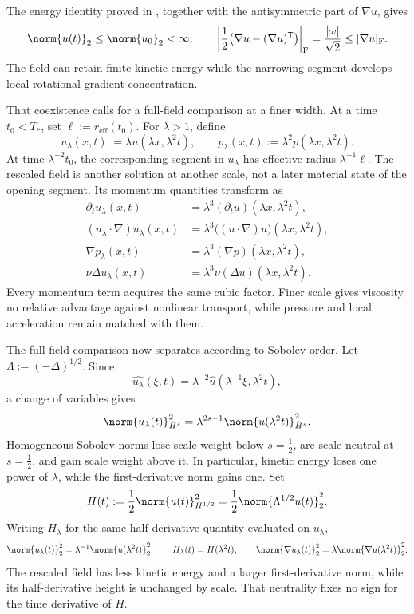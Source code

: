 The energy identity proved in , together with the antisymmetric part of \(\nabla u\), gives
\[
  \norm{u(t)}_2
  \leq
  \norm{u_0}_2
  <\infty,
  \qquad
  \left|\frac12\bigl(\nabla u-(\nabla u)^{\mathsf T}\bigr)\right|_{\mathrm F}
  =
  \frac{|\omega|}{\sqrt2}
  \leq
  |\nabla u|_{\mathrm F}.
\]
The field can retain finite kinetic energy while the narrowing segment develops local rotational-gradient concentration.


That coexistence calls for a full-field comparison at a finer width. At a time \(t_0<T_*\), set \(\ell:=r_{\mathrm{eff}}(t_0)\). For \(\lambda>1\), define
\[
  u_\lambda(x,t)
  :=
  \lambda u(\lambda x,\lambda^2t),
  \qquad
  p_\lambda(x,t)
  :=
  \lambda^2p(\lambda x,\lambda^2t).
\]
At time \(\lambda^{-2}t_0\), the corresponding segment in \(u_\lambda\) has effective radius \(\lambda^{-1}\ell\). The rescaled field is another solution at another scale, not a later material state of the opening segment. Its momentum quantities transform as
\[
\begin{aligned}
  \partial_tu_\lambda(x,t)
  &=
  \lambda^3(\partial_tu)(\lambda x,\lambda^2t),
  \\
  (u_\lambda\cdot\nabla)u_\lambda(x,t)
  &=
  \lambda^3\bigl((u\cdot\nabla)u\bigr)(\lambda x,\lambda^2t),
  \\
  \nabla p_\lambda(x,t)
  &=
  \lambda^3(\nabla p)(\lambda x,\lambda^2t),
  \\
  \nu\Delta u_\lambda(x,t)
  &=
  \lambda^3\nu(\Delta u)(\lambda x,\lambda^2t).
\end{aligned}
\]
Every momentum term acquires the same cubic factor. Finer scale gives viscosity no relative advantage against nonlinear transport, while pressure and local acceleration remain matched with them.


The full-field comparison now separates according to Sobolev order. Let \(\Lambda:=(-\Delta)^{1/2}\). Since
\[
  \widehat{u_\lambda}(\xi,t)
  =
  \lambda^{-2}\widehat u(\lambda^{-1}\xi,\lambda^2t),
\]
a change of variables gives
\[
  \norm{u_\lambda(t)}_{\dot H^s}^2
  =
  \lambda^{2s-1}
  \norm{u(\lambda^2t)}_{\dot H^s}^2.
\]
Homogeneous Sobolev norms lose scale weight below \(s=\tfrac12\), are scale neutral at \(s=\tfrac12\), and gain scale weight above it. In particular, kinetic energy loses one power of \(\lambda\), while the first-derivative norm gains one. Set
\[
  H(t)
  :=
  \frac12\norm{u(t)}_{\dot H^{1/2}}^2
  =
  \frac12\norm{\Lambda^{1/2}u(t)}_2^2.
\]
Writing \(H_\lambda\) for the same half-derivative quantity evaluated on \(u_\lambda\),
\[
  \norm{u_\lambda(t)}_2^2
  =
  \lambda^{-1}\norm{u(\lambda^2t)}_2^2,
  \qquad
  H_\lambda(t)=H(\lambda^2t),
  \qquad
  \norm{\nabla u_\lambda(t)}_2^2
  =
  \lambda\norm{\nabla u(\lambda^2t)}_2^2.
\]
The rescaled field has less kinetic energy and a larger first-derivative norm, while its half-derivative height is unchanged by scale. That neutrality fixes no sign for the time derivative of \(H\).

